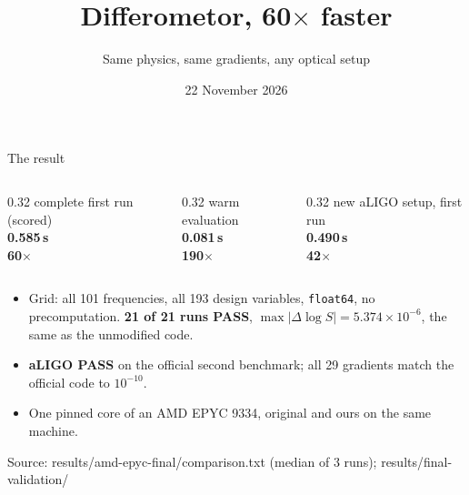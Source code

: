 \documentclass[aspectratio=169,11pt]{beamer}
\title{Differometor, 60$\times$ faster}
\subtitle{Same physics, same gradients, any optical setup}
\author{\team}
\institute{START Hack Munich 2026 $\cdot$ Feyer: Faster Physics}
\date{22 November 2026}
\newcommand{\bignum}[1]{{\fontsize{40}{44}\selectfont\bfseries #1}}
\newcommand{\hl}[1]{\textcolor{accent}{\textbf{#1}}}
\newcommand{\ok}[1]{\textcolor{good}{\textbf{#1}}}
\newcommand{\src}[1]{\par\vfill{\color{muted}\scriptsize Source: #1}}
\begin{document}
\begin{frame}[plain]
  \titlepage
\end{frame}

\begin{frame}{The result}
  \centering
  \vspace{0.4em}
  \begin{columns}[T]
    \begin{column}{0.32\textwidth}\centering
      {\color{muted}complete first run (scored)}\\[0.3em]
      \bignum{0.585\,s}\\[0.2em]
      \hl{60$\times$} 
    \end{column}
    \begin{column}{0.32\textwidth}\centering
      {\color{muted}warm evaluation}\\[0.3em]
      \bignum{0.081\,s}\\[0.2em]
      \hl{190$\times$} 
    \end{column}
    \begin{column}{0.32\textwidth}\centering
      {\color{muted}new aLIGO setup, first run}\\[0.3em]
      \bignum{0.490\,s}\\[0.2em]
      \hl{42$\times$} 
    \end{column}
  \end{columns}
  \vspace{1.0em}
  \begin{itemize}\small
    \item Grid: all 101 frequencies, all 193 design variables, \texttt{float64}, no precomputation. \ok{21 of 21 runs PASS}, $\max|\Delta\log S| = 5.374\times10^{-6}$, the same as the unmodified code.
    \item \ok{aLIGO PASS} on the official second benchmark; all 29 gradients match the official code to $10^{-10}$.
    \item One pinned core of an AMD EPYC 9334, original and ours on the same machine.
  \end{itemize}
  \src{results/amd-epyc-final/comparison.txt (median of 3 runs); results/final-validation/}
\end{frame}
\end{document}
